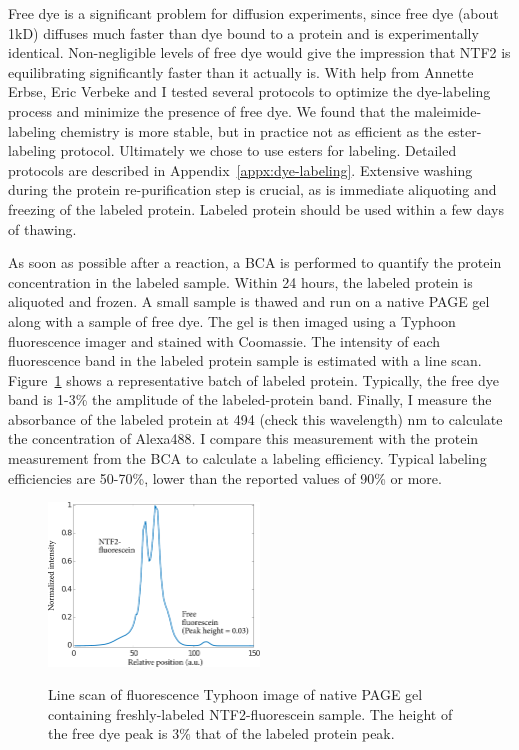 Free dye is a significant problem for diffusion experiments, since free dye (about 1kD) diffuses much faster than dye bound to a protein and is experimentally identical.  Non-negligible levels of free dye would give the impression that NTF2 is equilibrating significantly faster than it actually is.  With help from Annette Erbse, Eric Verbeke and I tested several protocols to optimize the dye-labeling process and minimize the presence of free dye.  We found that the maleimide-labeling chemistry is more stable, but in practice not as efficient as the ester-labeling protocol.  Ultimately we chose to use esters for labeling.  Detailed protocols are described in Appendix~\ref{appx:dye-labeling}.  Extensive washing during the protein re-purification step is crucial, as is immediate aliquoting and freezing of the labeled protein.  Labeled protein should be used within a few days of thawing.

As soon as possible after a reaction, a BCA is performed to quantify the protein concentration in the labeled sample.  Within 24 hours, the labeled protein is aliquoted and frozen.  A small sample is thawed and run on a native PAGE gel along with a sample of free dye.  The gel is then imaged using a Typhoon fluorescence imager and stained with Coomassie.  The intensity of each fluorescence band in the labeled protein sample is estimated with a line scan.  Figure~\ref{fig:free-dye-typhoon} shows a representative batch of labeled protein.  Typically, the free dye band is 1-3\% the amplitude of the labeled-protein band.  Finally, I measure the absorbance of the labeled protein at 494 (check this wavelength) nm to calculate the concentration of Alexa488.  I compare this measurement with the protein measurement from the BCA to calculate a labeling efficiency.  Typical labeling efficiencies are 50-70\%, lower than the reported values of 90\% or more.

\begin{figure} %
\caption{Line scan of fluorescence Typhoon image of native PAGE gel containing freshly-labeled NTF2-fluorescein sample.  The height of the free dye peak is 3\% that of the labeled protein peak.\\}
\centering
\includegraphics[width=0.5\textwidth]{figs/ch03/free-dye-typhoon}
\label{fig:free-dye-typhoon}
\end{figure} 

